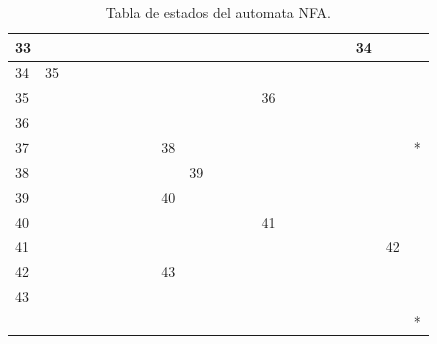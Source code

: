 \documentclass{article}
\begin{document}
\begin{table}[!htbp]
{\begin{adjustbox}{max width=\textwidth}
\begin{tabular}{|l|l|l|l|l|l|l|l|l|l|l|l|l|l|l|l|l|}
                33 & ~ & ~ & ~ & ~ & ~ & ~ & ~ & ~ & ~ & ~ & ~ & ~ & ~ & 34 & ~ & ~ \\ \hline
                34 & 35 & ~ & ~ & ~ & ~ & ~ & ~ & ~ & ~ & ~ & ~ & ~ & ~ & ~ & ~ & ~ \\ \hline
                35 & ~ & ~ & ~ & ~ & ~ & ~ & ~ & ~ & ~ & 36 & ~ & ~ & ~ & ~ & ~ & ~ \\ \hline
                36 & ~ & ~ & ~ & ~ & ~ & ~ & ~ & ~ & ~ & ~ & ~ & ~ & ~ & ~ & ~ & ~ \\ \hline
                37 & ~ & ~ & ~ & ~ & ~ & 38 & ~ & ~ & ~ & ~ & ~ & ~ & ~ & ~ & ~ & * \\ \hline
                38 & ~ & ~ & ~ & ~ & ~ & ~ & 39 & ~ & ~ & ~ & ~ & ~ & ~ & ~ & ~ & ~ \\ \hline
                39 & ~ & ~ & ~ & ~ & ~ & 40 & ~ & ~ & ~ & ~ & ~ & ~ & ~ & ~ & ~ & ~ \\ \hline
                40 & ~ & ~ & ~ & ~ & ~ & ~ & ~ & ~ & ~ & 41 & ~ & ~ & ~ & ~ & ~ & ~ \\ \hline
                41 & ~ & ~ & ~ & ~ & ~ & ~ & ~ & ~ & ~ & ~ & ~ & ~ & ~ & ~ & 42 & ~ \\ \hline
                42 & ~ & ~ & ~ & ~ & ~ & 43 & ~ & ~ & ~ & ~ & ~ & ~ & ~ & ~ & ~ & ~ \\ \hline
                43 & ~ & ~ & ~ & ~ & ~ & ~ & ~ & ~ & ~ & ~ & ~ & ~ & ~ & ~ & ~ & ~ \\ \hline
                ~ & ~ & ~ & ~ & ~ & ~ & ~ & ~ & ~ & ~ & ~ & ~ & ~ & ~ & ~ & ~ & * \\ \hline %
            \end{tabular}
            \end{adjustbox}
            }
            \caption{Tabla de estados del automata NFA.}\label{tab:my_label}
        \end{table}
\end{document}

